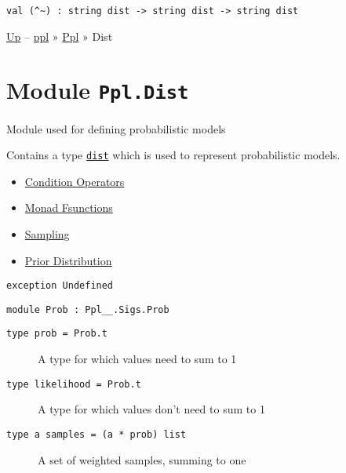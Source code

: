 \protect\hyperlink{val-ux28ux5cux255Eux7eux29}{}\texttt{val\ (\^{}\textasciitilde{})\ :\ string\ dist\ -\textgreater{}\ string\ dist\ -\textgreater{}\ string\ dist}

\href{../index.html}{Up} -- \href{../../index.html}{ppl} »
\href{../index.html}{Ppl} » Dist

\section{\texorpdfstring{Module
\texttt{Ppl.Dist}}{Module Ppl.Dist}}\label{module-ppl.dist}

Module used for defining probabilistic models

Contains a type \href{index.html\#type-dist}{\texttt{dist}} which is
used to represent probabilistic models.

\begin{itemize}
\tightlist
\item
  \protect\hyperlink{distux5fmonad}{Condition Operators}
\item
  \protect\hyperlink{distux5fmonad}{Monad Fsunctions}
\item
  \protect\hyperlink{distux5fsample}{Sampling}
\item
  \protect\hyperlink{prior}{Prior Distribution}
\end{itemize}

\protect\hyperlink{exception-Undefined}{}\texttt{exception\ }\texttt{Undefined}

\hypertarget{module-Prob}{}
\protect\hyperlink{module-Prob}{}\texttt{module\ Prob\ :\ Ppl\_\_.Sigs.Prob}

\begin{description}
\item[{\protect\hyperlink{type-prob}{}\texttt{type\ prob}\texttt{\ =\ Prob.t}}]
A type for which values need to sum to 1
\end{description}

\begin{description}
\item[{\protect\hyperlink{type-likelihood}{}\texttt{type\ likelihood}\texttt{\ =\ Prob.t}}]
A type for which values don't need to sum to 1
\end{description}

\begin{description}
\item[{\protect\hyperlink{type-samples}{}\texttt{type\ \textquotesingle{}a\ samples}\texttt{\ =\ (\textquotesingle{}a\ *\ prob)\ list}}]
A set of weighted samples, summing to one
\end{description}

